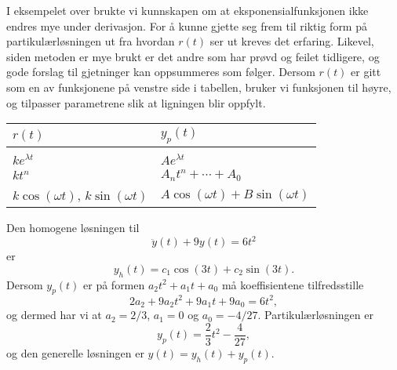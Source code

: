 \documentclass{article}
\theoremstyle{definition}
\theoremstyle{remark}
\newenvironment{ex}
{\pushQED{\qed}\renewcommand{\qedsymbol}{$\triangle$}\exx}
{\popQED\endexx}
\begin{document}
\begin{multicols*}{2}
I eksempelet over brukte vi kunnskapen om at eksponensialfunksjonen ikke endres mye under derivasjon. For å kunne gjette seg frem til riktig form på partikulærløsningen ut fra hvordan $r(t)$ ser ut kreves det erfaring. Likevel, siden metoden er mye brukt er det andre som har prøvd og feilet tidligere, og gode forslag til gjetninger kan oppsummeres som følger. Dersom $r(t)$ er gitt som en av funksjonene på venstre side i tabellen, bruker vi funksjonen til høyre, og tilpasser parametrene slik at ligningen blir oppfylt.

\begin{center}
  \begin{tabular}{m{} | m{}}
    $r(t)$ & $y_p(t)$ \\
    \hline \\
    $ke^{\lambda t}$ & $A e^{\lambda t}$ \\
    $k t^{n}$ & $A_n t^n + \cdots + A_0$ \\
    $k \cos(\omega t)$, $k \sin(\omega t)$ & \noindent\parbox[b]{\hsize}{$A \cos(\omega t) + B\sin(\omega t)$} \\
    $k e^{\lambda t} \cos(\omega t)$, $k e^{\lambda t} \sin(\omega t)$ & $e^{\lambda t} (A \cos(\omega t) + B\sin(\omega t))$ \\
  \end{tabular}
\end{center}

\begin{ex}
  Den homogene løsningen til
  \begin{equation*}
    \ddot{y}(t) + 9 y(t) = 6t^2
  \end{equation*}
  er
  \begin{equation*}
    y_h(t) = c_1 \cos(3t) + c_2 \sin(3t).
  \end{equation*}
  Dersom $y_p(t)$ er på formen $a_2 t^2 + a_1 t + a_0$ må koeffisientene tilfredsstille
  \begin{equation*}
    2a_2 + 9a_2 t^2 + 9a_1 t + 9 a_0 = 6 t^2,
  \end{equation*}
  og dermed har vi at $a_2 = 2/3$, $a_1 = 0$ og $a_0 = - 4/27$. Partikulærløsningen er
  \begin{equation*}
    y_p(t) = \frac{2}{3} t^2 - \frac{4}{27},
  \end{equation*}
  og den generelle løsningen er $y(t) = y_h(t) + y_p(t)$.
\end{ex}


\end{multicols*}
\end{document}
